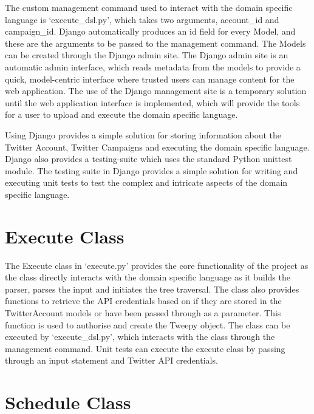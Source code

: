 The custom management command used to interact with the domain specific language is `execute\_dsl.py', which takes two arguments, account\_id and campaign\_id. Django automatically produces an id field for every Model, and these are the arguments to be passed to the management command. The Models can be created through the Django admin site. The Django admin site is an automatic admin interface, which reads metadata from the models to provide a quick, model-centric interface where trusted users can manage content for the web application. The use of the Django management site is a temporary solution until the web application interface is implemented, which will provide the tools for a user to upload and execute the domain specific language. \newline \par

Using Django provides a simple solution for storing information about the Twitter Account, Twitter Campaigns and executing the domain specific language. Django also provides a testing-suite which uses the standard Python unittest module. The testing suite in Django provides a simple solution for writing and executing unit tests to test the complex and intricate aspects of the domain specific language.

\section{Execute Class}

The Execute class in `execute.py' provides the core functionality of the project as the class directly interacts with the domain specific language as it builds the parser, parses the input and initiates the tree traversal. The class also provides functions to retrieve the API credentials based on if they are stored in the TwitterAccount models or have been passed through as a parameter. This function is used to authorise and create the Tweepy object. The class can be executed by `execute\_dsl.py', which interacts with the class through the management command. Unit tests can execute the execute class by passing through an input statement and Twitter API credentials.

\section{Schedule Class}

